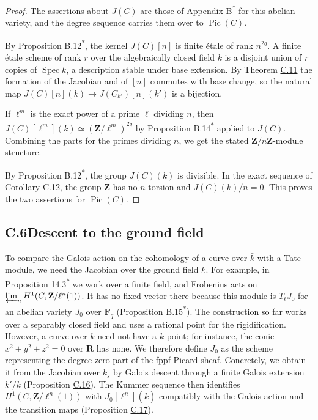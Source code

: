 \documentclass[11pt]{article}
\newcommand{\bpout}[1]{#1\textsuperscript{\hyperlink{bp-outside}{\ensuremath{\ast}}}}
\begin{document}
\begin{proof}[{Proof}]\label{bp46}%
The assertions about \(J(C)\) are those of Appendix \bpout{B} for this abelian variety, and the degree sequence carries them over to \(\operatorname{Pic}(C)\).

By Proposition \bpout{B.12}, the kernel \(J(C)[n]\) is finite étale of rank \(n^{2g}\). A finite étale scheme of rank \(r\) over the algebraically closed field \(k\) is a disjoint union of \(r\) copies of \(\operatorname{Spec}k\), a description stable under base extension. By Theorem \hyperref[bp36]{C.11} the formation of the Jacobian and of \([n]\) commutes with base change, so the natural map \(J(C)[n](k)\to J(C_{k'})[n](k')\) is a bijection.

If \(\ell^m\) is the exact power of a prime \(\ell\) dividing \(n\), then \(J(C)[\ell^m](k)\simeq(\mathbf Z/\ell^m)^{2g}\) by Proposition \bpout{B.14} applied to \(J(C)\). Combining the parts for the primes dividing \(n\), we get the stated \(\mathbf Z/n\mathbf Z\)-module structure.

By Proposition \bpout{B.12}, the group \(J(C)(k)\) is divisible. In the exact sequence of Corollary \hyperref[bp39]{C.12}, the group \(\mathbf Z\) has no \(n\)-torsion and \(J(C)(k)/n=0\). This proves the two assertions for \(\operatorname{Pic}(C)\).
\end{proof}


\subsection*{\texorpdfstring{C.6\quad Descent to the ground field}{C.6 Descent to the ground field}}
\label{bp47}%
\label{bp48}%
To compare the Galois action on the cohomology of a curve over \(\bar k\) with a Tate module, we need the Jacobian over the ground field \(k\). For example, in Proposition \bpout{14.3} we work over a finite field, and Frobenius acts on \(\varprojlim_nH^1(C,\mathbf Z/\ell^n(1))\). It has no fixed vector there because this module is \(T_\ell J_0\) for an abelian variety \(J_0\) over \(\mathbf F_q\) (Proposition \bpout{B.15}). The construction so far works over a separably closed field and uses a rational point for the rigidification. However, a curve over \(k\) need not have a \(k\)-point; for instance, the conic \(x^2+y^2+z^2=0\) over \(\mathbf R\) has none. We therefore define \(J_0\) as the scheme representing the degree-zero part of the fppf Picard sheaf. Concretely, we obtain it from the Jacobian over \(k_s\) by Galois descent through a finite Galois extension \(k'/k\) (Proposition \hyperref[bp49]{C.16}). The Kummer sequence then identifies \(H^1(C,\mathbf Z/\ell^n(1))\) with \(J_0[\ell^n](\bar k)\) compatibly with the Galois action and the transition maps (Proposition \hyperref[bp52]{C.17}).
\end{document}
